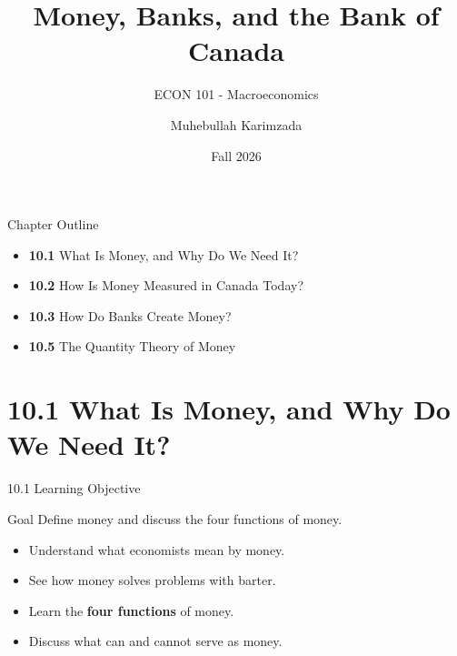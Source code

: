 \documentclass[aspectratio=169]{beamer}
\title{\textbf{Money, Banks, and the Bank of Canada \vspace{.5cm}\\  }}
\subtitle{ {\large ECON 101 - Macroeconomics}}
\author{Muhebullah Karimzada}
\date{Fall 2026}
\begin{document}
\begin{frame}[plain]
  \titlepage
\end{frame}

\begin{frame}{Chapter Outline}
\transfade
\begin{itemize}
  \item \textbf{10.1} What Is Money, and Why Do We Need It?
  \item \textbf{10.2} How Is Money Measured in Canada Today?
  \item \textbf{10.3} How Do Banks Create Money?
  \item \textbf{10.5} The Quantity Theory of Money
\end{itemize}
\end{frame}

\section{10.1 What Is Money, and Why Do We Need It?}

\begin{frame}{10.1 Learning Objective}
\transfade
\begin{block}{Goal}
Define money and discuss the four functions of money.
\end{block}
\begin{itemize}
  \item Understand what economists mean by \alert{money}.
  \item See how money solves problems with barter.
  \item Learn the \textbf{four functions} of money.
  \item Discuss what can and cannot serve as money.
\end{itemize}
\end{frame}
\end{document}
